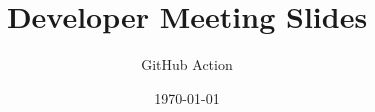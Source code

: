 \documentclass{beamer}
\title{Developer Meeting Slides}
\author{GitHub Action}
\institute{Overleaf}
\date{\today}
\begin{document}
\frame{\titlepage}

\begin{frame}

\end{frame}
\end{document}
